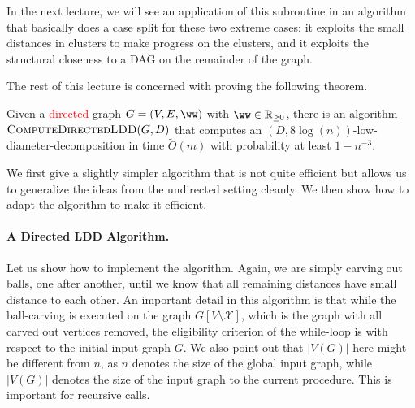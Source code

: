 In the next lecture, we will see an application of this subroutine in an algorithm that basically does a case split for these two extreme cases: it exploits the small distances in clusters to make progress on the clusters, and it exploits the structural closeness to a DAG on the remainder of the graph.

The rest of this lecture is concerned with proving the following theorem.

\begin{theorem}\label{thm:computeDirLDDguarantees}
Given a \textcolor{red}{directed} graph $G = (V,E,\ww)$ with $\ww \in \mathbb{R}_{\geq 0}$, there is an algorithm $\textsc{ComputeDirectedLDD}(G, D)$ that computes an $(D, 8 \log(n))$-low-diameter-decomposition in time $\tilde{O}(m)$ with probability at least $1-n^{-3}$. 
\end{theorem}

We first give a slightly simpler algorithm that is not quite efficient but allows us to generalize the ideas from the undirected setting cleanly. We then show how to adapt the algorithm to make it efficient.

\paragraph{A Directed LDD Algorithm.} Let us show how to implement the algorithm. Again, we are simply carving out balls, one after another, until we know that all remaining distances have small distance to each other. An important detail in this algorithm is that while the ball-carving is executed on the graph $G[V \setminus \mathcal{X}]$, which is the graph with all carved out vertices removed, the eligibility criterion of the while-loop is with respect to the initial input graph $G$. We also point out that $|V(G)|$ here might be different from $n$, as $n$ denotes the size of the global input graph, while $|V(G)|$ denotes the size of the input graph to the current procedure. This is important for recursive calls.

